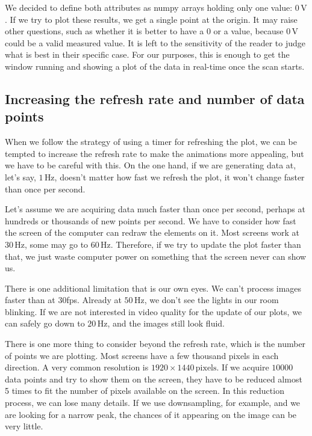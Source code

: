 We decided to define both attributes as numpy arrays holding only one value: $0\,\textrm{V}$. If we try to plot these results, we get a single point at the origin. It may raise other questions, such as whether it is better to have a $0$ or a  value, because $0\,\textrm{V}$ could be a valid measured value. It is left to the sensitivity of the reader to judge what is best in their specific case. For our purposes, this is enough to get the window running and showing a plot of the data in real-time once the scan starts.


\subsection{Increasing the refresh rate and number of data points}\label{subsec:refresh-rate-and-number-of-data-points}
When we follow the strategy of using a timer for refreshing the plot, we can be tempted to increase the refresh rate to make the animations more appealing, but we have to be careful with this. On the one hand, if we are generating data at, let's say, $1\,\textrm{Hz}$, doesn't matter how fast we refresh the plot, it won't change faster than once per second.

Let's assume we are acquiring data much faster than once per second, perhaps at hundreds or thousands of new points per second. We have to consider how fast the screen of the computer can redraw the elements on it. Most screens work at $30\,\textrm{Hz}$, some may go to $60\,\textrm{Hz}$. Therefore, if we try to update the plot faster than that, we just waste computer power on something that the screen never can show us.

There is one additional limitation that is our own eyes. We can't process images faster than at 30fps. Already at $50\,\textrm{Hz}$, we don't see the lights in our room blinking. If we are not interested in video quality for the update of our plots, we can safely go down to $20\,\textrm{Hz}$, and the images still look fluid.


There is one more thing to consider beyond the refresh rate, which is the number of points we are plotting. Most screens have a few thousand pixels in each direction. A very common resolution is $1920\times1440\,\textrm{pixels}$. If we acquire $10000$ data points and try to show them on the screen, they have to be reduced almost 5 times to fit the number of pixels available on the screen. In this reduction process, we can lose many details. If we use downsampling, for example, and we are looking for a narrow peak, the chances of it appearing on the image can be very little.

